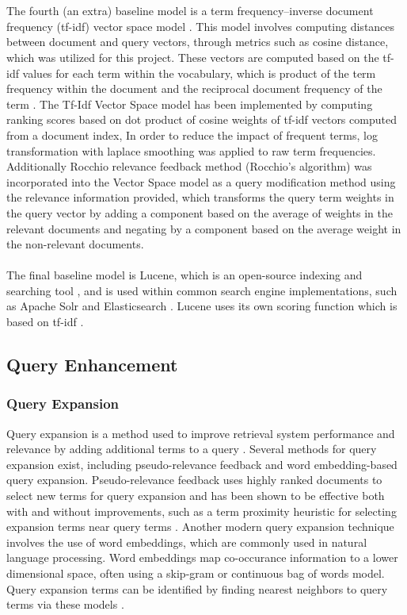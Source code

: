 \documentclass[conference]{IEEEtran}
\begin{document}
\\\\
The fourth (an extra) baseline model is a term frequency–inverse document frequency (tf-idf) vector space model \cite{salton1988term}. This model involves computing distances between document and query vectors, through metrics such as cosine distance, which was utilized for this project. These vectors are computed based on the tf-idf values for each term within the vocabulary, which is product of the term frequency within the document and the reciprocal document frequency of the term \cite{salton1988term}. The Tf-Idf Vector Space model has been implemented by computing ranking scores based on dot product of cosine weights of tf-idf vectors computed from a document index, In order to reduce the impact of frequent terms, log transformation with laplace smoothing was applied to raw term frequencies. Additionally Rocchio relevance feedback method (Rocchio's algorithm) was incorporated into the Vector Space model as a query modification method using the relevance information provided, which transforms the query term weights in the query vector by adding a component based on the average of weights in the relevant documents and negating by a component based on the average weight in the non-relevant documents.
\\\\
The final baseline model is Lucene, which is an open-source indexing and searching tool \cite{bialecki2012apache}, and is used within common search engine implementations, such as Apache Solr \cite{grainger2014solr} and Elasticsearch \cite{divya2013elasticsearch}. Lucene uses its own scoring function which is based on tf-idf \cite{bialecki2012apache}.

\subsection{Query Enhancement}
\subsubsection{Query Expansion}
Query expansion is a method used to improve retrieval system performance and relevance by adding additional terms to a query \cite{efthimiadis1996query}. Several methods for query expansion exist, including pseudo-relevance feedback and word embedding-based query expansion. Pseudo-relevance feedback uses highly ranked documents to select new terms for query expansion and has been shown to be effective both with and without improvements, such as a term proximity heuristic for selecting expansion terms near query terms \cite{lv2010positional}. Another modern query expansion technique involves the use of word embeddings, which are commonly used in natural language processing. Word embeddings map co-occurance information to a lower dimensional space, often using a skip-gram or continuous bag of words model. Query expansion terms can be identified by finding nearest neighbors to query terms via these models \cite{diaz2016query}.
\end{document}

